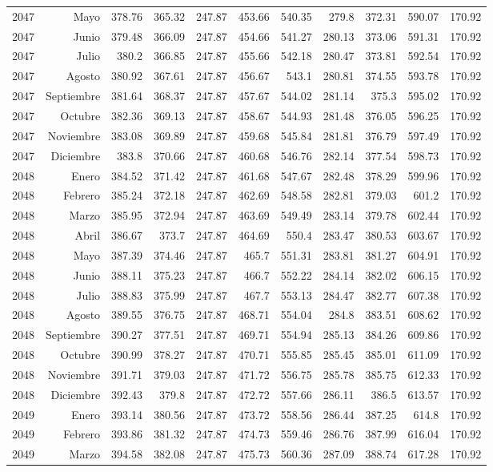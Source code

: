 \documentclass{article}%
\begin{document}
\begin{longtable}{|l r|r|r|r|r|r|r|r|r|r|}
2047&Mayo&378.76&365.32&247.87&453.66&540.35&279.8&372.31&590.07&170.92\\%
2047&Junio&379.48&366.09&247.87&454.66&541.27&280.13&373.06&591.31&170.92\\%
2047&Julio&380.2&366.85&247.87&455.66&542.18&280.47&373.81&592.54&170.92\\%
2047&Agosto&380.92&367.61&247.87&456.67&543.1&280.81&374.55&593.78&170.92\\%
2047&Septiembre&381.64&368.37&247.87&457.67&544.02&281.14&375.3&595.02&170.92\\%
2047&Octubre&382.36&369.13&247.87&458.67&544.93&281.48&376.05&596.25&170.92\\%
2047&Noviembre&383.08&369.89&247.87&459.68&545.84&281.81&376.79&597.49&170.92\\%
2047&Diciembre&383.8&370.66&247.87&460.68&546.76&282.14&377.54&598.73&170.92\\%
2048&Enero&384.52&371.42&247.87&461.68&547.67&282.48&378.29&599.96&170.92\\%
2048&Febrero&385.24&372.18&247.87&462.69&548.58&282.81&379.03&601.2&170.92\\%
2048&Marzo&385.95&372.94&247.87&463.69&549.49&283.14&379.78&602.44&170.92\\%
2048&Abril&386.67&373.7&247.87&464.69&550.4&283.47&380.53&603.67&170.92\\%
2048&Mayo&387.39&374.46&247.87&465.7&551.31&283.81&381.27&604.91&170.92\\%
2048&Junio&388.11&375.23&247.87&466.7&552.22&284.14&382.02&606.15&170.92\\%
2048&Julio&388.83&375.99&247.87&467.7&553.13&284.47&382.77&607.38&170.92\\%
2048&Agosto&389.55&376.75&247.87&468.71&554.04&284.8&383.51&608.62&170.92\\%
2048&Septiembre&390.27&377.51&247.87&469.71&554.94&285.13&384.26&609.86&170.92\\%
2048&Octubre&390.99&378.27&247.87&470.71&555.85&285.45&385.01&611.09&170.92\\%
2048&Noviembre&391.71&379.03&247.87&471.72&556.75&285.78&385.75&612.33&170.92\\%
2048&Diciembre&392.43&379.8&247.87&472.72&557.66&286.11&386.5&613.57&170.92\\%
2049&Enero&393.14&380.56&247.87&473.72&558.56&286.44&387.25&614.8&170.92\\%
2049&Febrero&393.86&381.32&247.87&474.73&559.46&286.76&387.99&616.04&170.92\\%
2049&Marzo&394.58&382.08&247.87&475.73&560.36&287.09&388.74&617.28&170.92\\%

\end{longtable}
\end{document}
